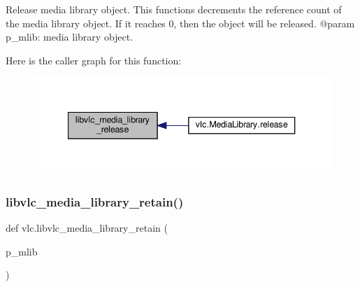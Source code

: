 \begin{DoxyVerb}Release media library object. This functions decrements the
reference count of the media library object. If it reaches 0,
then the object will be released.
@param p_mlib: media library object.
\end{DoxyVerb}
 Here is the caller graph for this function\+:
\nopagebreak
\begin{figure}[H]
\begin{center}
\leavevmode
\includegraphics[width=340pt]{namespacevlc_ab8ba23cb322d7e138eb8873e23796646_icgraph}
\end{center}
\end{figure}
\mbox{\label{namespacevlc_a16294700c444448851d5055267aa57aa}} 
\subsubsection{\texorpdfstring{libvlc\+\_\+media\+\_\+library\+\_\+retain()}{libvlc\_media\_library\_retain()}}
{\footnotesize\ttfamily def vlc.\+libvlc\+\_\+media\+\_\+library\+\_\+retain (\begin{DoxyParamCaption}\item[{}]{p\+\_\+mlib }\end{DoxyParamCaption})}


